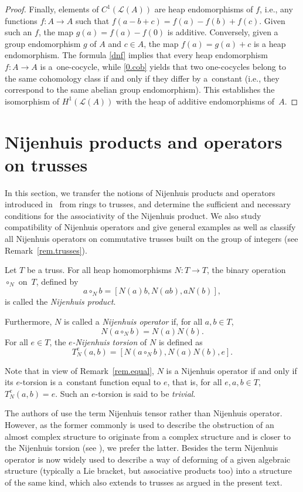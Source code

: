 \documentclass[10pt,a4paper]{amsart}
\numberwithin{equation}{section}
\begin{document}
\begin{proof}
 Finally, elements of $C^1(\mathcal{L}(A))$ are heap endomorphisms of $f$, i.e., any functions $f\colon A\to A$ such that $f(a-b+c) = f(a)-f(b) +f(c)$. Given such an $f$, the map $g(a) = f(a) -f(0)$ is additive. Conversely, given a group endomorphism $g$ of $A$ and $c\in A$, the map $f(a) = g(a) +c$ is a heap endomorphism. The formula \eqref{dnf} implies that every heap endomorphism $f\colon A\to A$ is a~one-cocycle, while \eqref{0.cob} yields that two one-cocycles belong to the same cohomology class if and only if they differ by a~constant (i.e., they correspond to the same abelian group endomorphism). This establishes the isomorphism of $H^1(\mathcal{L}(A))$ with the heap of additive endomorphisms of~$A$.
\end{proof}

\section{Nijenhuis products and operators on trusses}\label{section4}

In this section, we transfer the notions of Nijenhuis products and operators introduced in~\cite{4} from rings to trusses, and determine the sufficient and necessary conditions for the associativity of the Nijenhuis product. We also study compatibility of Nijenhuis operators and give general examples as well as classify all Nijenhuis operators on commutative trusses built on the group of integers (see Remark~\ref{rem.trusses}).
\begin{Definition}\label{def.Nij.tor}
Let $T$ be a truss. For all heap homomorphisms $N\colon T \rightarrow T$, the binary operation~$\circ_{N}$ on~$T$, defined by
\[a \circ_{N} b = [N(a)b, N(ab), aN(b)],\]
is called the \textit{Nijenhuis product}.

Furthermore, $N$ is called a
\textit{Nijenhuis operator} if, for all $a,b \in T$,
\[N(a \circ_{N} b) = N(a)N(b).\]
For all $e \in T$, the \textit{$e$-Nijenhuis torsion} of $N$ is defined as
\[T^{e}_{N}(a,b) = [N(a \circ_{N} b),N(a)N(b),e].\]
\end{Definition}

Note that in view of Remark~\ref{rem.equal}, $N$ is a Nijenhuis operator if and only if its $e$-torsion is a~constant function equal to $e$, that is, for all $e,a,b\in T$, $T^{e}_{N}(a,b)=e$. Such an $e$-torsion is said to be \textit{trivial}.

\begin{Remark}
 The authors of \cite{4} use the term Nijenhuis tensor rather than Nijenhuis operator. However, as the former commonly is used to describe the obstruction of an almost complex structure to originate from a complex structure and is closer to the Nijenhuis torsion (see \cite[footnote~1, p.~627]{Kos:Nij}), we prefer the latter. Besides the term Nijenhuis operator is now widely used to describe a way of deforming of a given algebraic structure (typically a Lie bracket, but associative products too) into a structure of the same kind, which also extends to trusses as argued in the present text.
\end{Remark}
\end{document}
